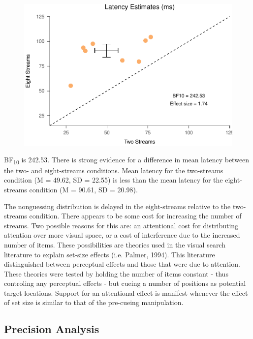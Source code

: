 \documentclass[,man]{apa6}
\theoremstyle{definition}
\theoremstyle{definition}
\theoremstyle{definition}
\theoremstyle{remark}
\begin{document}
\begin{figure}
\centering
\includegraphics{nStreams_Bayesian_files/figure-latex/unnamed-chunk-3-1.pdf}
\caption{}
\end{figure}

BF\textsubscript{10} is 242.53. There is strong evidence for a
difference in mean latency between the two- and eight-streams
conditions. Mean latency for the two-streams condition (M = 49.62, SD =
22.55) is less than the mean latency for the eight-streams condition (M
= 90.61, SD = 20.98).

The nonguessing distribution is delayed in the eight-streams relative to
the two-streams condition. There appears to be some cost for increasing
the number of streams. Two possible reasons for this are: an attentional
cost for distributing attention over more visual space, or a cost of
interference due to the increased number of items. These possibilities
are theories used in the visual search literature to explain set-size
effects (i.e. Palmer, 1994). This literature distinguished between
perceptual effects and those that were due to attention. These theories
were tested by holding the number of items constant - thus controling
any perceptual effects - but cueing a number of positions as potential
target locations. Support for an attentional effect is manifest whenever
the effect of set size is similar to that of the pre-cueing
manipulation.

\subsection{Precision Analysis}\label{precision-analysis}
\end{document}
